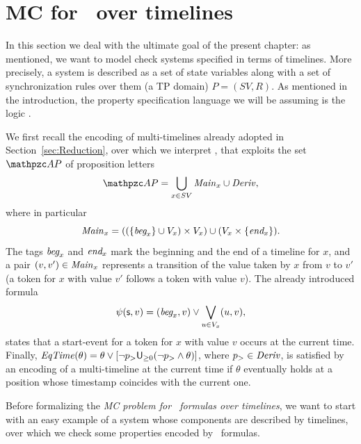 \section{MC for \MITL\ over timelines}\label{sec:modelcheckingTimelines}

In this section we deal with the ultimate goal of the present chapter:
as mentioned, we want to model check systems specified in terms of timelines. More precisely, 
a system is described as a set of state variables along with a set of synchronization rules over them (a TP domain) $P=(SV,R)$.
As mentioned in the introduction, the property specification language we will be assuming is the logic \MITL.

We first recall the encoding of multi-timelines already adopted in Section~\ref{sec:Reduction}, 
over which we interpret \MITL,
that exploits 
the set $\Prop$ of proposition letters
\[
\Prop = \bigcup_{x\in SV}\Main_x \cup \Deriv ,
\] 
where in particular
\[
{\mathit{Main}}_x = ((\{\textit{beg}_x \}\cup V_x) \times V_x)   \cup   (V_x \times \{\textit{end}_x\}).
\]
The tags $\textit{beg}_x$ and $\textit{end}_x$ mark the beginning and the end of a timeline for $x$, and a pair $(v,v')\in {\mathit{Main}}_x$ represents a 
transition of the value taken by $x$ from $v$ to $v'$ (a token for $x$ with value $v'$ follows a token with value $v$).
The already introduced formula 
\[
\psi(\mathsf{s},v)= (\textit{beg}_x,v)\vee \displaystyle{\bigvee_{u\in V_x}}(u,v),
\]
states that a start-event for a token for $x$ with value $v$ occurs at the current time.
Finally, ${\mathit{EqTime}}(\theta) = \theta \vee [\neg p_> \textsf{U}_{\geq 0}(\neg p_> \wedge \theta)]$, where $p_>\in{\mathit{Deriv}}$, is satisfied
by an encoding of a multi-timeline at the current time if $\theta$ eventually holds at a position whose timestamp coincides with the current one.

Before formalizing the \emph{MC problem for \MITL\ formulas over timelines}, we want to start with an easy example of a system whose components are described by timelines, over which we check some properties encoded by \MITL\ formulas.

